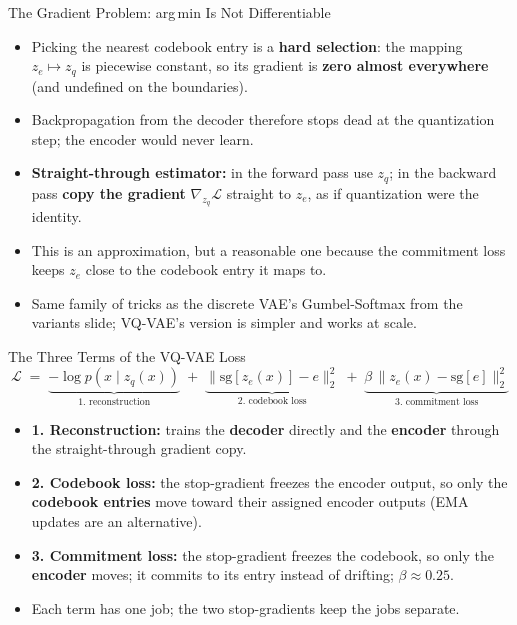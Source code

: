 \begin{frame}{The Gradient Problem: arg\,min Is Not Differentiable}
\begin{itemize}
    \item Picking the nearest codebook entry is a \textbf{hard selection}: the mapping $z_e \mapsto z_q$ is piecewise constant, so its gradient is \textbf{zero almost everywhere} (and undefined on the boundaries).
    \item Backpropagation from the decoder therefore stops dead at the quantization step; the encoder would never learn.
    \item \textbf{Straight-through estimator:} in the forward pass use $z_q$; in the backward pass \textbf{copy the gradient} $\nabla_{z_q} \mathcal{L}$ straight to $z_e$, as if quantization were the identity.
    \item This is an approximation, but a reasonable one because the commitment loss keeps $z_e$ close to the codebook entry it maps to.
    \item Same family of tricks as the discrete VAE's Gumbel-Softmax from the variants slide; VQ-VAE's version is simpler and works at scale.
\end{itemize}
\end{frame}

\begin{frame}{The Three Terms of the VQ-VAE Loss}
\[
\mathcal{L} \;=\; \underbrace{-\log p(x \mid z_q(x))}_{\text{1. reconstruction}} \;+\; \underbrace{\|\mathrm{sg}[z_e(x)] - e\|_2^2}_{\text{2. codebook loss}} \;+\; \underbrace{\beta \, \|z_e(x) - \mathrm{sg}[e]\|_2^2}_{\text{3. commitment loss}}
\]
\begin{itemize}
    \item \textbf{1. Reconstruction:} trains the \textbf{decoder} directly and the \textbf{encoder} through the straight-through gradient copy.
    \item \textbf{2. Codebook loss:} the stop-gradient freezes the encoder output, so only the \textbf{codebook entries} move toward their assigned encoder outputs (EMA updates are an alternative).
    \item \textbf{3. Commitment loss:} the stop-gradient freezes the codebook, so only the \textbf{encoder} moves; it commits to its entry instead of drifting; $\beta \approx 0.25$.
    \item Each term has one job; the two stop-gradients keep the jobs separate.
\end{itemize}
\end{frame}

